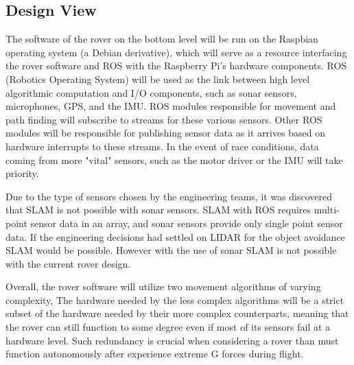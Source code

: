\documentclass[onecolumn, draftclsnofoot,10pt, compsoc]{IEEEtran}
\begin{document}
\subsection{Design View}
The software of the rover on the bottom level will be run on the Raspbian operating system (a Debian derivative), which will serve as a resource interfacing the rover software and ROS with the Raspberry Pi's hardware components. ROS (Robotics Operating System) will be used as the link between high level algorithmic computation and I/O components, such as sonar sensors, microphones, GPS, and the IMU. ROS modules responsible for movement and path finding will subscribe to streams for these various sensors. Other ROS modules will be responsible for publishing sensor data as it arrives based on hardware interrupts to these streams. In the event of race conditions, data coming from more "vital" sensors, such as the motor driver or the IMU will take priority. 

Due to the type of sensors chosen by the engineering teams, it was discovered that SLAM is not possible with sonar sensors. SLAM with ROS requires multi-point sensor data in an array, and sonar sensors provide only single point sensor data. If the engineering decisions had settled on LIDAR for the object avoidance SLAM would be possible. However with the use of sonar SLAM is not possible with the current rover design. 

Overall, the rover software will utilize two movement algorithms of varying complexity, The hardware needed by the less complex algorithms will be a strict subset of the hardware needed by their more complex counterparts, meaning that the rover can still function to some degree even if most of its sensors fail at a hardware level. Such redundancy is crucial when considering a rover than must function autonomously after experience extreme G forces during flight. 
\end{document}
